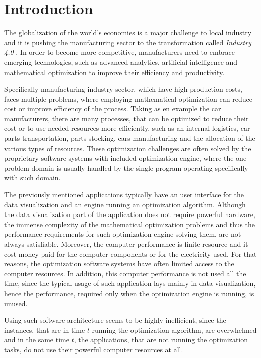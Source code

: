\chapter{Introduction}\label{ch:introduction}
The globalization of the world’s economies is a major challenge to local industry 
and it is pushing the manufacturing sector to the transformation called \textit{Industry 4.0} \cite{industry40}.
In order to become more competitive, 
manufacturers need to embrace emerging technologies, 
such as advanced analytics, artificial intelligence 
and mathematical optimization to improve their efficiency and productivity.

Specifically manufacturing industry sector,
which have high production costs,
faces multiple problems,
where employing mathematical optimization can reduce cost or improve efficiency of the process.
Taking as en example the car manufacturers,
there are many processes,
that can be optimized to reduce their cost or to use needed resources more efficiently,
such as an internal logistics, car parts transportation, parts stocking, cars manufacturing 
and the allocation of the various types of resources.
These optimization challenges are often solved by the proprietary software systems with included optimization engine,
where the one problem domain is usually handled by the single program operating specifically with such domain.

The previously mentioned applications typically have an user interface for the data visualization
and an engine running an optimization algorithm.
Although the data visualization part of the application does not require powerful hardware,
the immense complexity of the mathematical optimization problems 
and thus the performance requirements for such optimization engine solving them, are not always satisfiable.
Moreover,
the computer performance is finite resource
and it cost money paid for the computer components or for the electricity used.
For that reasons,
the optimization software systems have often limited access to the computer resources.
In addition,
this computer performance is not used all the time,
since the typical usage of such application lays mainly in data visualization,
hence the performance, required only when the optimization engine is running, is unused.

Using such software architecture seems to be highly inefficient,
since the instances, that are in time $t$ running the optimization algorithm, are overwhelmed 
and in the same time $t$,
the applications, that are not running the optimization tasks,
do not use their powerful computer resources at all.

